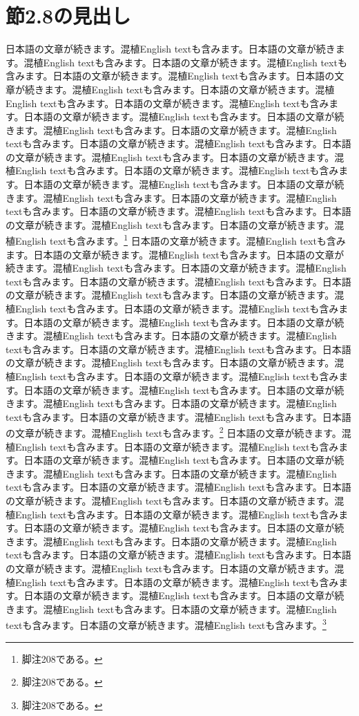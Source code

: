 \documentclass[pdflatex,book]{jlreq}
\begin{document}
\section{節2.8の見出し}
日本語の文章が続きます。混植English textも含みます。日本語の文章が続きます。混植English textも含みます。日本語の文章が続きます。混植English textも含みます。日本語の文章が続きます。混植English textも含みます。日本語の文章が続きます。混植English textも含みます。日本語の文章が続きます。混植English textも含みます。日本語の文章が続きます。混植English textも含みます。日本語の文章が続きます。混植English textも含みます。日本語の文章が続きます。混植English textも含みます。日本語の文章が続きます。混植English textも含みます。日本語の文章が続きます。混植English textも含みます。日本語の文章が続きます。混植English textも含みます。日本語の文章が続きます。混植English textも含みます。日本語の文章が続きます。混植English textも含みます。日本語の文章が続きます。混植English textも含みます。日本語の文章が続きます。混植English textも含みます。日本語の文章が続きます。混植English textも含みます。日本語の文章が続きます。混植English textも含みます。日本語の文章が続きます。混植English textも含みます。日本語の文章が続きます。混植English textも含みます。\footnote{脚注208である。}
日本語の文章が続きます。混植English textも含みます。日本語の文章が続きます。混植English textも含みます。日本語の文章が続きます。混植English textも含みます。日本語の文章が続きます。混植English textも含みます。日本語の文章が続きます。混植English textも含みます。日本語の文章が続きます。混植English textも含みます。日本語の文章が続きます。混植English textも含みます。日本語の文章が続きます。混植English textも含みます。日本語の文章が続きます。混植English textも含みます。日本語の文章が続きます。混植English textも含みます。日本語の文章が続きます。混植English textも含みます。日本語の文章が続きます。混植English textも含みます。日本語の文章が続きます。混植English textも含みます。日本語の文章が続きます。混植English textも含みます。日本語の文章が続きます。混植English textも含みます。日本語の文章が続きます。混植English textも含みます。日本語の文章が続きます。混植English textも含みます。日本語の文章が続きます。混植English textも含みます。日本語の文章が続きます。混植English textも含みます。日本語の文章が続きます。混植English textも含みます。\footnote{脚注208である。}
日本語の文章が続きます。混植English textも含みます。日本語の文章が続きます。混植English textも含みます。日本語の文章が続きます。混植English textも含みます。日本語の文章が続きます。混植English textも含みます。日本語の文章が続きます。混植English textも含みます。日本語の文章が続きます。混植English textも含みます。日本語の文章が続きます。混植English textも含みます。日本語の文章が続きます。混植English textも含みます。日本語の文章が続きます。混植English textも含みます。日本語の文章が続きます。混植English textも含みます。日本語の文章が続きます。混植English textも含みます。日本語の文章が続きます。混植English textも含みます。日本語の文章が続きます。混植English textも含みます。日本語の文章が続きます。混植English textも含みます。日本語の文章が続きます。混植English textも含みます。日本語の文章が続きます。混植English textも含みます。日本語の文章が続きます。混植English textも含みます。日本語の文章が続きます。混植English textも含みます。日本語の文章が続きます。混植English textも含みます。日本語の文章が続きます。混植English textも含みます。\footnote{脚注208である。}
\end{document}
